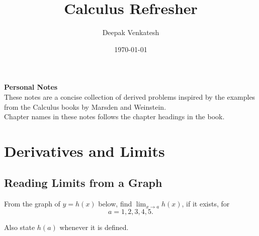 \documentclass[11pt]{article}
\title{Calculus Refresher}
\author{Deepak Venkatesh}
\date{\today}
\begin{document}
\maketitle
\tableofcontents
\newpage

\noindent\textbf{Personal Notes}\\

\noindent These notes are a concise collection of derived problems inspired by the examples from the Calculus books by Marsden and Weinstein.\\

\noindent Chapter names in these notes follows the chapter headings in the book.

\newpage

\section{Derivatives and Limits}

\subsection{Reading Limits from a Graph}

From the graph of $y=h(x)$ below, find $\lim_{x\to a} h(x)$, if it exists, for
$$
a=1,2,3,4,5.
$$

Also state $h(a)$ whenever it is defined.
\end{document}
